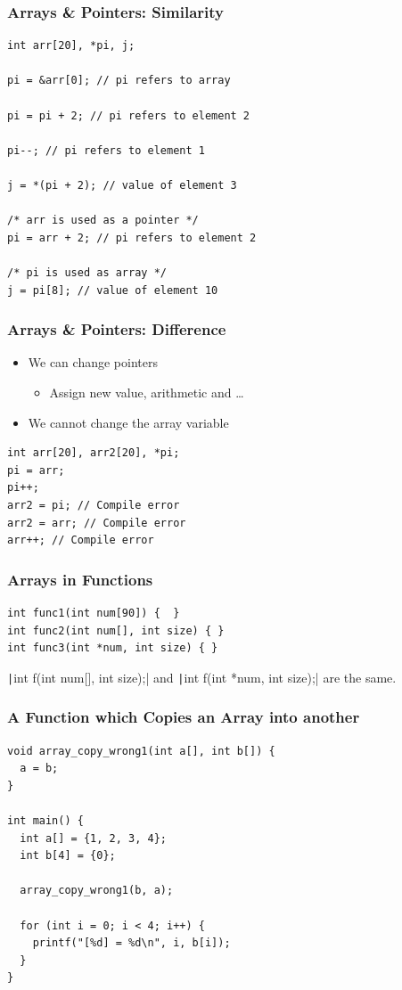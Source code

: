 \documentclass{../c-lecture}
\begin{document}
\begin{frame}[fragile]
  \frametitle{Arrays \& Pointers: Similarity}
  \begin{verbatim}
int arr[20], *pi, j;

pi = &arr[0]; // pi refers to array

pi = pi + 2; // pi refers to element 2

pi--; // pi refers to element 1

j = *(pi + 2); // value of element 3

/* arr is used as a pointer */
pi = arr + 2; // pi refers to element 2

/* pi is used as array */
j = pi[8]; // value of element 10
  \end{verbatim}
\end{frame}

\begin{frame}[fragile]
  \frametitle{Arrays \& Pointers: Difference}
  \begin{itemize}
    \item We can change pointers
    \begin{itemize}
      \item Assign new value, arithmetic and \ldots
    \end{itemize}
    \item We cannot change the array variable
  \end{itemize}
  \begin{verbatim}
int arr[20], arr2[20], *pi;
pi = arr;
pi++;
arr2 = pi; // Compile error
arr2 = arr; // Compile error
arr++; // Compile error
  \end{verbatim}
\end{frame}

\begin{frame}[fragile]
  \frametitle{Arrays in Functions}
  \begin{verbatim}
int func1(int num[90]) {  }
int func2(int num[], int size) { }
int func3(int *num, int size) { }
  \end{verbatim}
  \begin{block}{}
    \texttt|int f(int num[], int size);|
    and
    \texttt|int f(int *num, int size);|
    are the same.
  \end{block}
\end{frame}

\begin{frame}[fragile]
  \frametitle{A Function which Copies an Array into another}
  \begin{verbatim}
void array_copy_wrong1(int a[], int b[]) {
  a = b;
}

int main() {
  int a[] = {1, 2, 3, 4};
  int b[4] = {0};

  array_copy_wrong1(b, a);

  for (int i = 0; i < 4; i++) {
    printf("[%d] = %d\n", i, b[i]);
  }
}
  \end{verbatim}
\end{frame}
\end{document}
